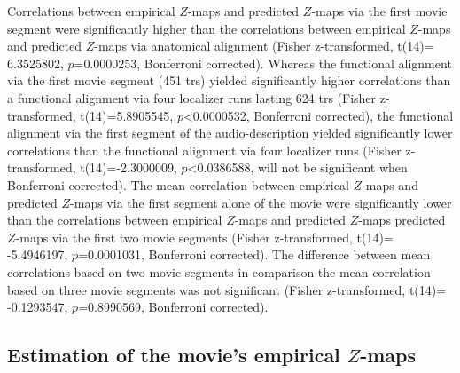 

%
Correlations between empirical $Z$-maps and predicted $Z$-maps via the first
movie segment were significantly higher than the correlations between empirical
$Z$-maps and predicted $Z$-maps via anatomical alignment (Fisher z-transformed,
t(14)= 6.3525802, $p$=0.0000253, Bonferroni corrected).
%
Whereas the functional alignment via the first movie segment (451 \acp{tr})
yielded significantly higher correlations than a functional alignment via four
localizer runs lasting 624 \acp{tr} (Fisher z-transformed, t(14)=5.8905545,
$p$<0.0000532, Bonferroni corrected),
%
the functional alignment via the first segment of the audio-description yielded
significantly lower correlations than the functional alignment via four
localizer runs (Fisher z-transformed, t(14)=-2.3000009, $p$<0.0386588, will not
be significant when Bonferroni corrected).
%
The mean correlation between empirical $Z$-maps and predicted $Z$-maps via the
first segment alone of the movie were significantly lower than the
correlations between empirical $Z$-maps and predicted $Z$-maps predicted
$Z$-maps via the first two movie segments (Fisher
z-transformed, t(14)= -5.4946197, $p$=0.0001031, Bonferroni corrected).
%
The difference between mean correlations based on two movie segments in
comparison the mean correlation based on three movie segments was not
significant (Fisher z-transformed, t(14)= -0.1293547, $p$=0.8990569, Bonferroni
corrected).


\subsection{Estimation of the movie's empirical $Z$-maps}


